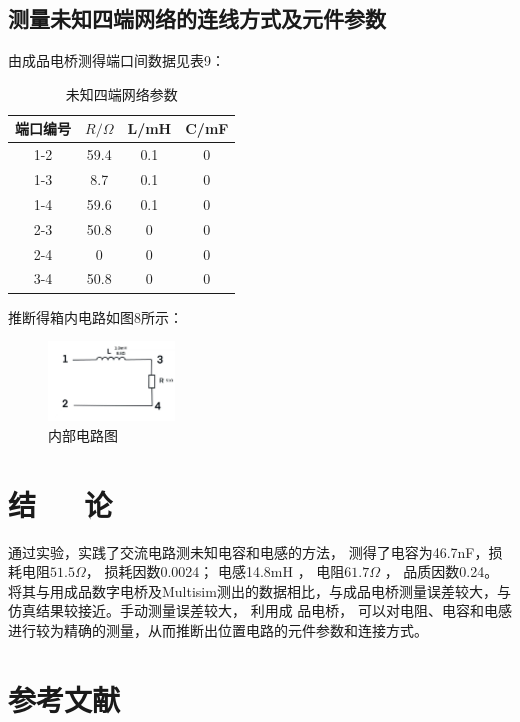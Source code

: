 \documentclass[10pt,a4paper,twocolumn,twoside,UTF8]{ctexart}
\begin{document}
\subsection{测量未知四端网络的连线方式及元件参数}

由成品电桥测得端口间数据见表9：
\begin{table}[!h]
	\centering
	  \begin{tabular}{cccc}
	  \toprule
	  端口编号 & $R/\Omega$ & L/mH & C/mF \\
	  \midrule
	  1-2   & 59.4   & 0.1   & 0 \\
	  1-3  & 8.7   & 0.1   & 0 \\
	  1-4  & 59.6   & 0.1   & 0 \\
	  2-3  & 50.8   & 0   & 0 \\
	  2-4  & 0   & 0   & 0 \\
	  3-4   & 50.8   & 0   & 0 \\
	  \bottomrule
	  \end{tabular}%
	\caption{未知四端网络参数}
	\label{tab:9}%
  \end{table}%

推断得箱内电路如图8所示：
\begin{figure}
	\centering
	\includegraphics[width=0.3\textwidth]{img//blackbox.jpg}%
	\caption{内部电路图}
	\label{fig:8}
\end{figure}


\section{结~~~论}
通过实验，实践了交流电路测未知电容和电感的方法， 测得了电容为46.7nF，损耗电阻$51.5\Omega$， 损耗因数0.0024； 电感14.8mH  ， 电阻$61.7\Omega$ 
， 品质因数0.24。将其与用成品数字电桥及Multisim测出的数据相比，与成品电桥测量误差较大，与仿真结果较接近。手动测量误差较大， 利用成
品电桥， 可以对电阻、电容和电感进行较为精确的测量，从而推断出位置电路的元件参数和连接方式。

\printbibliography[title=参考文献]

\section{参考文献}
\end{document}
